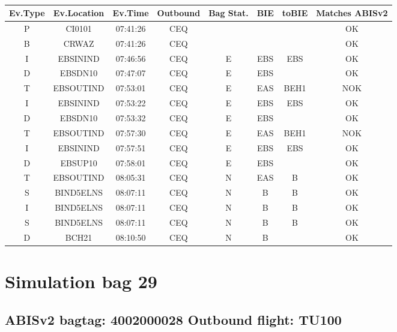 \documentclass{report}
\begin{document}
\paragraph{}
\begin{longtable}{cccccccc}    \toprule
\rowcolor{white!50}
\textbf{Ev.Type} & \textbf{Ev.Location} & \textbf{Ev.Time} & \textbf{Outbound} & \textbf{Bag Stat.} & \textbf{BIE} & \textbf{toBIE} & \textbf{Matches ABISv2} \\\midrule
P & CI0101 & 07:41:26  & CEQ &  &  &  & OK\\
B & CRWAZ & 07:41:26  & CEQ &  &  &  & OK\\
I & EBSININD & 07:46:56  & CEQ & E & EBS & EBS & OK\\
D & EBSDN10 & 07:47:07  & CEQ & E & EBS &  & OK\\
T & EBSOUTIND & 07:53:01  & CEQ & E & EAS & BEH1 & NOK\\
I & EBSININD & 07:53:22  & CEQ & E & EBS & EBS & OK\\
D & EBSDN10 & 07:53:32  & CEQ & E & EBS &  & OK\\
T & EBSOUTIND & 07:57:30  & CEQ & E & EAS & BEH1 & NOK\\
I & EBSININD & 07:57:51  & CEQ & E & EBS & EBS & OK\\
D & EBSUP10 & 07:58:01  & CEQ & E & EBS &  & OK\\
T & EBSOUTIND & 08:05:31  & CEQ & N & EAS & B & OK\\
S & BIND5ELNS & 08:07:11  & CEQ & N & B & B & OK\\
I & BIND5ELNS & 08:07:11  & CEQ & N & B & B & OK\\
S & BIND5ELNS & 08:07:11  & CEQ & N & B & B & OK\\
D & BCH21 & 08:10:50  & CEQ & N & B &  & OK\\
\bottomrule
\end{longtable}
\pagebreak
\section*{Simulation bag 29}
\subsection*{ABISv2 bagtag: 4002000028 Outbound flight: TU100}
\end{document}
